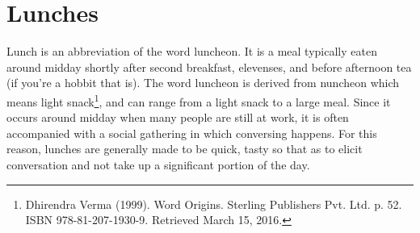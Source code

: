 \AddToShipoutPicture*{\SalmonVegetableRice}
\chapter{Lunches}

Lunch is an abbreviation of the word luncheon. It is a meal typically eaten around midday shortly after second breakfast, elevenses, and before afternoon tea (if you're a hobbit that is). The word luncheon is derived from nuncheon which means light snack\footnote{Dhirendra Verma (1999). Word Origins. Sterling Publishers Pvt. Ltd. p. 52. ISBN 978-81-207-1930-9. Retrieved March 15, 2016.}, and can range from a light snack to a large meal. Since it occurs around midday when many people are still at work, it is often accompanied with a social gathering in which conversing happens. For this reason, lunches are generally made to be quick, tasty so that as to elicit conversation and not take up a significant portion of the day.